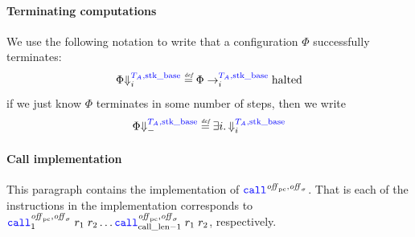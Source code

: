 \documentclass[a4paper]{article}
\begin{document}
\paragraph{Terminating computations}
We use the following notation to write that a configuration $\Phi$ successfully terminates:
\[
  \Phi\sterm[i]{\src{\ta,\stkb}} \defeq \Phi \nstep[i]{\src{\ta,\stkb}} \halted
\]
if we just know $\Phi$ terminates in some number of steps, then we write
\[
  \Phi\sterm{\src{\ta,\stkb}} \defeq \exists i \ldotp \sterm[i]{\src{\ta,\stkb}}
\]

\paragraph{Call implementation}
\label{par:call-impl}
This paragraph contains the implementation of $\scall{\offpc,\offsigma}{}{}$. That is each of the instructions in the implementation corresponds to $\scall[1]{\offpc,\offsigma}{r_1}{r_2} \dots \scall[\calllen-1]{\offpc,\offsigma}{r_1}{r_2}$, respectively.
\end{document}

